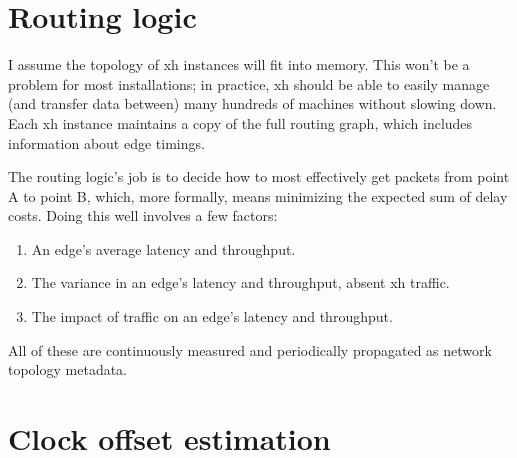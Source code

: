 \documentclass{report}
\begin{document}

\section{Routing logic}\label{sec:routing-logic}
    I assume the topology of xh instances will fit into memory. This won't be a
    problem for most installations; in practice, xh should be able to easily
    manage (and transfer data between) many hundreds of machines without
    slowing down. Each xh instance maintains a copy of the full routing graph,
    which includes information about edge timings.

    The routing logic's job is to decide how to most effectively get packets
    from point A to point B, which, more formally, means minimizing the
    expected sum of delay costs. Doing this well involves a few factors:

\begin{enumerate}
\item{An edge's average latency and throughput.}
\item{The variance in an edge's latency and throughput, absent xh}
       traffic.
\item{The impact of traffic on an edge's latency and throughput.}
\end{enumerate}

    All of these are continuously measured and periodically propagated as
    network topology metadata.

\begin{perlcode}
 \end{perlcode}

\section{Clock offset estimation}\label{sec:clock-offset-estimation}
    
\end{document}
